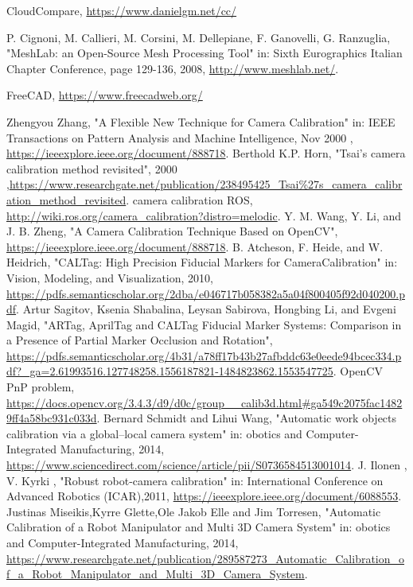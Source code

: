 \begin{thebibliography}{1}
		CloudCompare,
		\url{https://www.danielgm.net/cc/}

		P. Cignoni, M. Callieri, M. Corsini, M. Dellepiane, F. Ganovelli, G. Ranzuglia,
		"MeshLab: an Open-Source Mesh Processing Tool" in: Sixth Eurographics Italian Chapter Conference, page 129-136, 2008, \url{http://www.meshlab.net/}.

		FreeCAD,
		\url{https://www.freecadweb.org/}


		Zhengyou Zhang,
		"A Flexible New Technique for Camera Calibration" in: IEEE Transactions on Pattern Analysis and Machine Intelligence, Nov 2000 , \url{https://ieeexplore.ieee.org/document/888718}.
		Berthold K.P. Horn,
		"Tsai’s camera calibration method revisited", 2000 ,\url{https://www.researchgate.net/publication/238495425_Tsai%27s_camera_calibration_method_revisited}.
		camera calibration ROS, 
		\url{http://wiki.ros.org/camera_calibration?distro=melodic}.
		Y. M. Wang,  Y. Li, and J. B. Zheng,
		"A Camera Calibration Technique Based on OpenCV", \url{https://ieeexplore.ieee.org/document/888718}.
		B. Atcheson, F. Heide, and W. Heidrich,
		"CALTag: High Precision Fiducial Markers for CameraCalibration" in: Vision, Modeling, and Visualization, 2010, \url{https://pdfs.semanticscholar.org/2dba/e046717b058382a5a04f800405f92d040200.pdf}.
		Artur Sagitov, Ksenia Shabalina, Leysan Sabirova, Hongbing Li, and Evgeni Magid,
		"ARTag, AprilTag and CALTag Fiducial Marker Systems: Comparison in a Presence of Partial Marker Occlusion and Rotation", \url{https://pdfs.semanticscholar.org/4b31/a78ff17b43b27afbddc63e0eede94bcec334.pdf?_ga=2.61993516.127748258.1556187821-1484823862.1553547725}.
		OpenCV PnP problem, \url{https://docs.opencv.org/3.4.3/d9/d0c/group__calib3d.html#ga549c2075fac14829ff4a58bc931c033d}.
		Bernard Schmidt and Lihui Wang,
		"Automatic work objects calibration via a global–local camera system" in: obotics and Computer-Integrated Manufacturing, 2014, \url{https://www.sciencedirect.com/science/article/pii/S0736584513001014}.
		 J. Ilonen , V. Kyrki ,
		"Robust robot-camera calibration" in: International Conference on Advanced Robotics (ICAR),2011, \url{https://ieeexplore.ieee.org/document/6088553}.
		Justinas Miseikis,Kyrre Glette,Ole Jakob Elle and Jim Torresen,
		"Automatic Calibration of a Robot Manipulator and Multi 3D Camera System" in: obotics and Computer-Integrated Manufacturing, 2014, \url{https://www.researchgate.net/publication/289587273_Automatic_Calibration_of_a_Robot_Manipulator_and_Multi_3D_Camera_System}.




\end{thebibliography}
